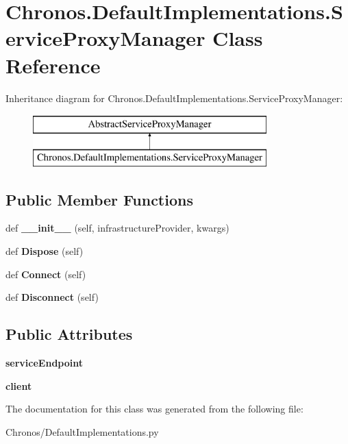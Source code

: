 \hypertarget{classChronos_1_1DefaultImplementations_1_1ServiceProxyManager}{}\section{Chronos.\+Default\+Implementations.\+Service\+Proxy\+Manager Class Reference}
\label{classChronos_1_1DefaultImplementations_1_1ServiceProxyManager}
Inheritance diagram for Chronos.\+Default\+Implementations.\+Service\+Proxy\+Manager\+:\begin{figure}[H]
\begin{center}
\leavevmode
\includegraphics[height=2.000000cm]{classChronos_1_1DefaultImplementations_1_1ServiceProxyManager}
\end{center}
\end{figure}
\subsection*{Public Member Functions}
\begin{DoxyCompactItemize}
\item 
def {\bfseries \+\_\+\+\_\+init\+\_\+\+\_\+} (self, infrastructure\+Provider, kwargs)
\item 
def {\bfseries Dispose} (self)
\item 
def {\bfseries Connect} (self)
\item 
def {\bfseries Disconnect} (self)
\end{DoxyCompactItemize}
\subsection*{Public Attributes}
\begin{DoxyCompactItemize}
\item 
{\bfseries service\+Endpoint}
\item 
{\bfseries client}
\end{DoxyCompactItemize}


The documentation for this class was generated from the following file\+:\begin{DoxyCompactItemize}
\item 
Chronos/Default\+Implementations.\+py\end{DoxyCompactItemize}
